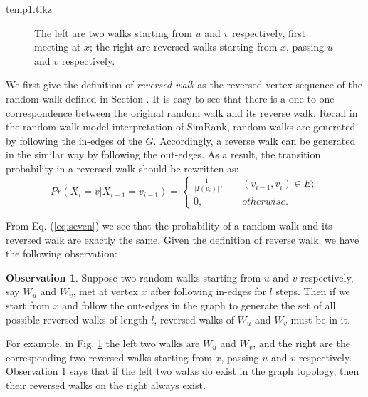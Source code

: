 \documentclass[conference]{IEEEtran}
\theoremstyle{definition}
\theoremstyle{definition}
\newtheorem{observation}{Observation}%
\newcommand{\rom}[1]{\uppercase\expandafter{\romannumeral #1\relax}}
\begin{document}
\begin{filecontents*}{temp1.tikz}
\end{filecontents*}
\begin{figure}[t]
\centering
\label{fig:graph1}
\resizebox{!}{!}{}
\caption{The left are two walks starting from $u$ and $v$ respectively, first meeting at $x$; the right are reversed walks starting from $x$, passing $u$ and $v$ respectively.}\label{fig:one}
\end{figure}

We first give the definition of \emph{reversed walk} as the reversed vertex sequence of the random walk defined in Section \rom{3}.
It is easy to see that there is a one-to-one correspondence between the original random walk and its reverse walk.
Recall in the random walk model interpretation of SimRank, random walks are generated by following the in-edges of the $G$.
 Accordingly, a reverse walk can be generated in the similar way  by following the out-edges.
As a result, the transition probability  in a reversed walk should  be rewritten as:
\begin{equation}
Pr(X_i=v|X_{i-1}=v_{i-1}) = \left\{
        \begin{array}{ll}
	\frac{1}{|I(v_{i})|}, & \quad (v_{i-1}, v_i) \in E; \\
	0,  &\quad otherwise.
        \end{array}
    \right.
	\label{eq:eight}
\end{equation}

From Eq. (\ref{eq:seven}) we see  that the probability of a random walk and its reversed walk are exactly the same.
Given the definition of reverse walk, we  have the following observation:
\begin{observation}
Suppose two random walks starting from $u$ and $v$ respectively, say $W_u$ and $W_v$, met at vertex $x$ after following in-edges for $l$ steps. 
Then if we start from $x$ and follow the out-edges in the graph to generate the set of all possible reversed walks of length $l$, reversed walks of $W_u$ and $W_v$ must be in it.
\end{observation}
For example, in Fig. \ref{fig:one} the left two walks are $W_u$ and $W_v$, and the right are the corresponding two reversed walks starting from $x$, passing $u$ and $v$ respectively. 
Observation 1 says that if the left two walks do exist in the graph topology, then their reversed walks on the right always exist.
\end{document}
